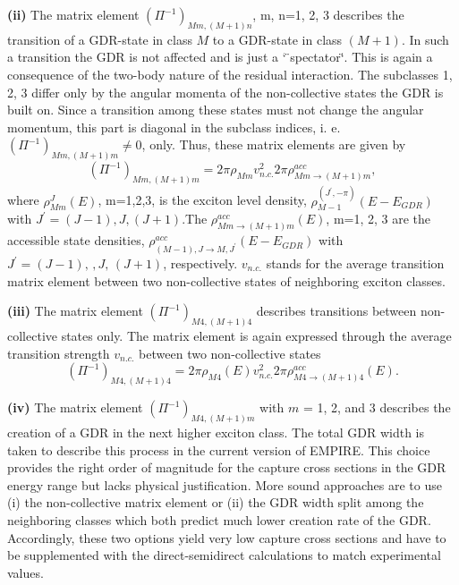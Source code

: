 \smallskip \textbf{(ii)} The matrix element $(\Pi^{-1})_{Mm,(M+1)n}$, m,
n=1, 2, 3 describes the transition of a GDR-state in class $M$ to a
GDR-state in class $(M+1)$. In such a transition the GDR is not affected and
is just a \char`%
\"{}spectator\char`\"{}. This is again a consequence of the two-body nature
of the residual interaction. The subclasses 1, 2, 3 differ only by the
angular momenta of the non-collective states the GDR is built on. Since a
transition among these states must not change the angular momentum, this part
is diagonal in the subclass indices, i. e. $(\Pi^{-1})_{Mm,(M+1)m}\not=0$,
only. Thus, these matrix elements are given by
\begin{equation}
(\Pi^{-1})_{Mm,(M+1)m}=2\pi\rho_{Mm}v_{n.c.}^{2}2\pi\rho_{Mm%
\rightarrow(M+1)m}^{acc},
\end{equation}
where $\rho_{Mm}^{J}(E)$, m=1,2,3, is the exciton level density,%
 $\rho_{M-1}^{(J^{\prime},-\pi)}(E-E_{GDR})$
with $J^{\prime}=(J-1),J,(J+1)$.The $\rho_{Mm\rightarrow(M+1)m}^{acc}(E)$, m=1,
2, 3 are the accessible state densities, $\rho_{(M-1),J\rightarrow
M,J^{\prime}}^{acc}(E-E_{GDR})$ with $J^{\prime}=(J-1),\,,J,\,(J+1)$,
respectively. $v_{n.c.}$ stands for the average transition matrix element
between two non-collective states of neighboring exciton classes.

\smallskip \textbf{(iii)} The matrix element $(\Pi^{-1})_{M4,(M+1)4}$
describes transitions between non-collective states only. The matrix element
is again expressed through the average transition strength $v_{n.c.}$
between two non-collective states
\begin{equation}
(\Pi^{-1})_{M4,(M+1)4}=2\pi\rho_{M4}(E)v_{n.c.}^{2}2\pi\rho_{M4%
\rightarrow(M+1)4}^{acc}(E).
\end{equation}

\smallskip \textbf{(iv)} The matrix element $(\Pi^{-1})_{M4,(M+1)m}$ with $m$
= 1, 2, and 3 describes the creation of a GDR in the next higher exciton
class.  The total GDR width is taken to
describe this process in the current version of EMPIRE. This choice provides
the right order of magnitude for the capture cross sections in the GDR energy range
but lacks physical justification.
More sound approaches are to use
(i) the non-collective matrix element or (ii) the GDR width split among the neighboring
classes which both predict much lower creation rate of the GDR. Accordingly, these two
options yield very low capture cross sections and have to be supplemented with the
direct-semidirect calculations to match experimental values.

